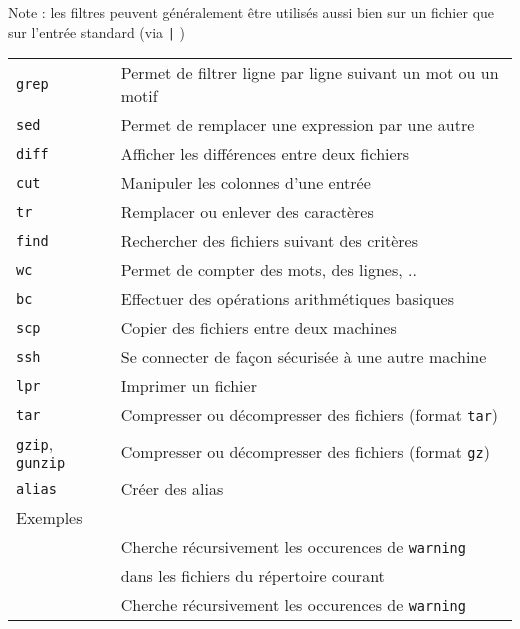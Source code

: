 \documentclass [a4paper]{article}
\begin{document}
Note : les filtres peuvent généralement être utilisés aussi bien sur un fichier que sur l'entrée standard (via \og \verb+|+ \fg{})
\begin{tabular}{ ll }
\hline
{\verb+grep+}                                    & Permet de filtrer ligne par ligne suivant un mot ou un motif\\
{\verb+sed+}                                     & Permet de remplacer une expression par une autre\\
{\verb+diff+}                                    & Afficher les différences entre deux fichiers\\
{\verb+cut+}                                     & Manipuler les colonnes d'une entrée\\
{\verb+tr+}                                      & Remplacer ou enlever des caractères\\
{\verb+find+}                                    & Rechercher des fichiers suivant des critères\\
{\verb+wc+}                                      & Permet de compter des mots, des lignes, ..\\
{\verb+bc+}                                      & Effectuer des opérations arithmétiques basiques\\
{\verb+scp+}                                     & Copier des fichiers entre deux machines \\
{\verb+ssh+}                                     & Se connecter de façon sécurisée à une autre machine\\
{\verb+lpr+}                                     & Imprimer un fichier\\
{\verb+tar+}                                     & Compresser ou décompresser des fichiers (format \verb+tar+)\\
{\verb+gzip+, \verb+gunzip+}                     & Compresser ou décompresser des fichiers (format \verb+gz+)\\
{\verb+alias+}                                   & Créer des alias\\
\hline
Exemples                                         & \\
\hspace{0.5cm}{\verb+grep -nr "warning" ./+}              & Cherche récursivement les occurences de \verb+warning+\\
                                                          & dans les fichiers du répertoire courant\\
\hspace{0.5cm}{\verb+./prog.exe | grep -nr "warning" ./+} & Cherche récursivement les occurences de \verb+warning+\\

\end{tabular}
\end{document}
